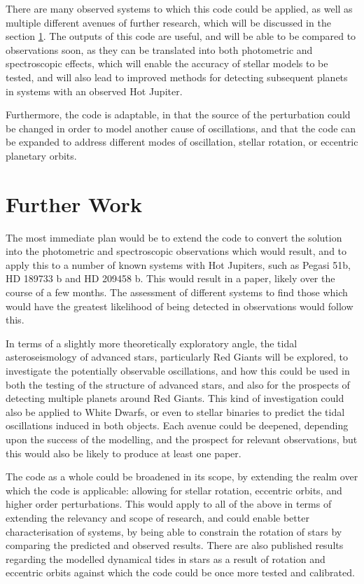 \documentclass[11pt]{amsart}
\begin{document}
There are many observed systems to which this code could be applied, as well as multiple different avenues of further research, which will be discussed in the section \ref{Future}.  The outputs of this code are useful, and will be able to be compared to observations soon, as they can be translated into both photometric and spectroscopic effects, which will enable the accuracy of stellar models to be tested, and will also lead to improved methods for detecting subsequent planets in systems with an observed Hot Jupiter.

Furthermore, the code is adaptable, in that the source of the perturbation could be changed in order to model another cause of oscillations, and that the code can be expanded to address different modes of oscillation, stellar rotation, or eccentric planetary orbits.







\section{Further Work}   \label{Future}


The most immediate plan would be to extend the code to convert the solution into the photometric and spectroscopic observations which would result, and to apply this to a number of known systems with Hot Jupiters, such as Pegasi 51b, HD 189733 b and HD 209458 b.  This would result in a paper, likely over the course of a few months.  The assessment of different systems to find those which would have the greatest likelihood of being detected in observations would follow this.

In terms of a slightly more theoretically exploratory angle, the tidal asteroseismology of advanced stars, particularly Red Giants will be explored, to investigate the potentially observable oscillations, and how this could be used in both the testing of the structure of advanced stars, and also for the prospects of detecting multiple planets around Red Giants.  This kind of investigation could also be applied to White Dwarfs, or even to stellar binaries to predict the tidal oscillations induced in both objects.  Each avenue could be deepened, depending upon the success of the modelling, and the prospect for relevant observations, but this would also be likely to produce at least one paper.

The code as a whole could be broadened in its scope, by extending the realm over which the code is applicable: allowing for stellar rotation, eccentric orbits, and higher order perturbations.  This would apply to all of the above in terms of extending the relevancy and scope of research, and could enable better characterisation of systems, by being able to constrain the rotation of stars by comparing the predicted and observed results.  There are also published results regarding the modelled dynamical tides in stars as a result of rotation and eccentric orbits \cite{Burkart2012} against which the code could be once more tested and calibrated.
\end{document}
